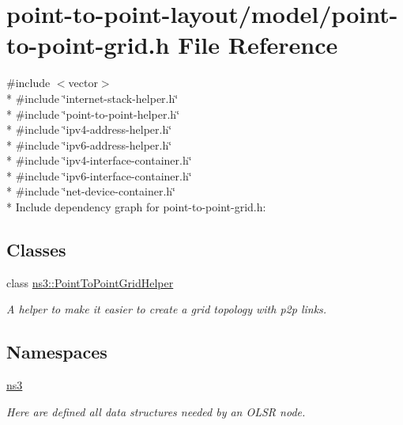 \hypertarget{point-to-point-grid_8h}{}\section{point-\/to-\/point-\/layout/model/point-\/to-\/point-\/grid.h File Reference}
\label{point-to-point-grid_8h}
{\ttfamily \#include $<$vector$>$}\\*
{\ttfamily \#include \char`\"{}internet-\/stack-\/helper.\+h\char`\"{}}\\*
{\ttfamily \#include \char`\"{}point-\/to-\/point-\/helper.\+h\char`\"{}}\\*
{\ttfamily \#include \char`\"{}ipv4-\/address-\/helper.\+h\char`\"{}}\\*
{\ttfamily \#include \char`\"{}ipv6-\/address-\/helper.\+h\char`\"{}}\\*
{\ttfamily \#include \char`\"{}ipv4-\/interface-\/container.\+h\char`\"{}}\\*
{\ttfamily \#include \char`\"{}ipv6-\/interface-\/container.\+h\char`\"{}}\\*
{\ttfamily \#include \char`\"{}net-\/device-\/container.\+h\char`\"{}}\\*
Include dependency graph for point-\/to-\/point-\/grid.h\+:
\subsection*{Classes}
\begin{DoxyCompactItemize}
\item 
class \hyperlink{classns3_1_1PointToPointGridHelper}{ns3\+::\+Point\+To\+Point\+Grid\+Helper}
\begin{DoxyCompactList}\small\item\em A helper to make it easier to create a grid topology with p2p links. \end{DoxyCompactList}\end{DoxyCompactItemize}
\subsection*{Namespaces}
\begin{DoxyCompactItemize}
\item 
 \hyperlink{namespacens3}{ns3}
\begin{DoxyCompactList}\small\item\em Here are defined all data structures needed by an O\+L\+SR node. \end{DoxyCompactList}\end{DoxyCompactItemize}
